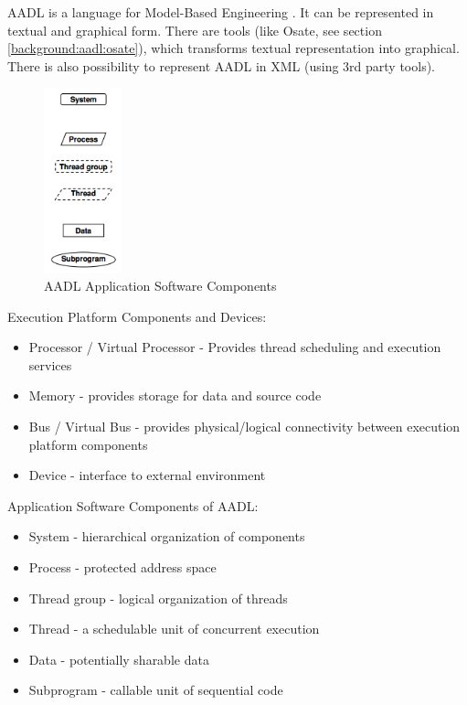 AADL is a language for Model-Based Engineering \cite{AadlBook}. It can be represented in textual and graphical form. There are tools (like Osate, see section \ref{background:aadl:osate}), which transforms textual representation into graphical. There is also possibility to represent AADL in XML (using 3rd party tools). 

\begin{figure}
  \begin{center}
    \includegraphics[width=0.2\textwidth]{figures/aadl-app-components.png}
  \end{center}
  \caption{AADL Application Software Components}
  \label{figure:aadl_app_software_components}
\end{figure}

Execution Platform Components and Devices:
\begin{itemize}
	\item Processor / Virtual Processor - Provides thread scheduling and execution services
	\item Memory - provides storage for data and source code
	\item Bus / Virtual Bus - provides physical/logical connectivity between execution platform components
	\item Device - interface to external environment
\end{itemize}

Application Software Components of AADL:
\begin{itemize}
	\item System - hierarchical organization of components
	\item Process - protected address space
	\item Thread group - logical organization of threads
	\item Thread - a schedulable unit of concurrent execution
	\item Data - potentially sharable data
	\item Subprogram - callable unit of sequential code
\end{itemize}

